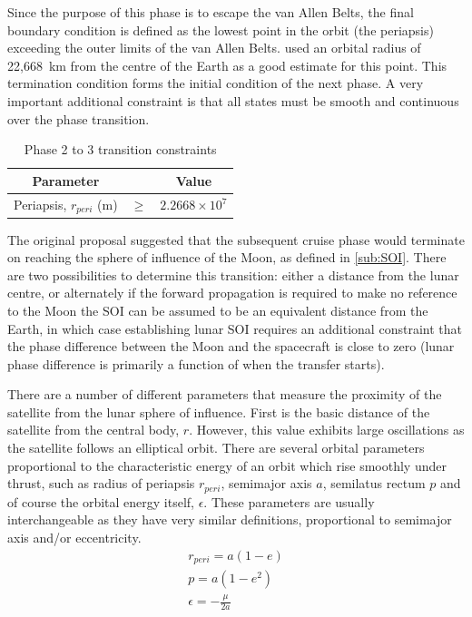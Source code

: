 Since the purpose of this phase is to escape the van Allen Belts, the final boundary condition is defined as the lowest point in the orbit (the periapsis) exceeding the outer limits of the van Allen Belts. \textcite{Letterio_thesis} used an orbital radius of 22,668~km from the centre of the Earth as a good estimate for this point. This termination condition forms the initial condition of the next phase. A very important additional constraint is that all states must be smooth and continuous over the phase transition.

\begin{table}[h]
\caption{Phase 2 to 3 transition constraints}
\label{tab:Phase-2-3-constraints}
\begin{center}
\begin{tabular} {ccc}\toprule
Parameter & & Value\\\midrule
Periapsis, $r_{peri}$ (m) &$\ge$& $2.2668\times 10^7$\\\bottomrule
\end{tabular}
\end{center}
\end{table}

The original proposal \parencite{Roeser2006} suggested that the subsequent cruise phase would terminate on reaching the sphere of influence of the Moon, as defined in \autoref{sub:SOI}. There are two possibilities to determine this transition: either a distance from the lunar centre, or alternately if the forward propagation is required to make no reference to the Moon the SOI can be assumed to be an equivalent distance from the Earth, in which case establishing lunar SOI requires an additional constraint that the phase difference between the Moon and the spacecraft is close to zero (lunar phase difference is primarily a function of when the transfer starts). 

There are a number of different parameters that measure the proximity of the satellite from the lunar sphere of influence. First is the basic distance of the satellite from the central body, $r$. However, this value exhibits large oscillations as the satellite follows an elliptical orbit. There are several orbital parameters proportional to the characteristic energy of an orbit which rise smoothly under thrust, such as radius of periapsis $r_{peri}$, semimajor axis $a$, semilatus rectum $p$ and of course the orbital energy itself, $\epsilon$. These parameters are usually interchangeable as they have very similar definitions, proportional to semimajor axis and/or eccentricity.
\begin{gather}
r_{peri} = a(1-e)\\
p = a(1-e^2)\\
\epsilon = -\frac{\mu}{2a}
\end{gather}

